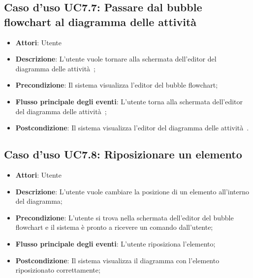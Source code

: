 \documentclass[../AnalisiDeiRequisiti.tex]{subfiles}
\begin{document}
				\subsection{Caso d'uso UC7.7: Passare dal bubble flowchart al diagramma delle attività }
				\begin{itemize}
					\item \textbf{Attori}: Utente
					\item \textbf{Descrizione}: L'utente vuole tornare alla schermata dell'editor del diagramma delle attività ;
					\item \textbf{Precondizione}: Il sistema visualizza l'editor del bubble flowchart;
					\item \textbf{Flusso principale degli eventi}: L'utente torna alla schermata dell'editor del diagramma delle attività ;
					\item \textbf{Postcondizione}: Il sistema visualizza l'editor del diagramma delle attività .
				\end{itemize}
				\subsection{Caso d'uso UC7.8: Riposizionare un elemento}
				\begin{itemize}
					\item \textbf{Attori}: Utente
					\item \textbf{Descrizione}: L'utente vuole cambiare la posizione di un elemento all'interno del diagramma;
					\item \textbf{Precondizione}: L'utente si trova nella schermata dell'editor del bubble flowchart e il sistema è pronto a ricevere un comando dall'utente;
					\item \textbf{Flusso principale degli eventi}: L'utente riposiziona l'elemento;
					\item \textbf{Postcondizione}: Il sistema visualizza il diagramma con l'elemento riposizionato correttamente;
				\end{itemize}
\end{document}
